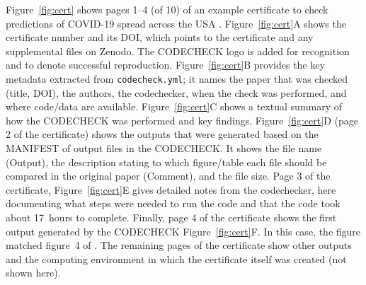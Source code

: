 \documentclass[12pt]{article}
\begin{document}
Figure~\ref{fig:cert} shows pages 1--4 (of 10) of an example
certificate to check predictions of COVID-19 spread across the USA
\cite{cert-2020-012,unwin_report_2020}.  Figure~\ref{fig:cert}A shows
the certificate number and its DOI, which points to the certificate
and any supplemental files on Zenodo.  The CODECHECK logo is added for
recognition and to denote successful reproduction.
Figure~\ref{fig:cert}B provides the key metadata extracted from
\texttt{codecheck.yml}; it names the paper that was checked (title,
DOI), the authors, the codechecker, when the check was performed, and
where code/data are available.
Figure~\ref{fig:cert}C shows a textual summary of how the CODECHECK
was performed and key findings.  Figure~\ref{fig:cert}D
(page 2 of the certificate) shows the outputs that were generated
based on the MANIFEST of output files in the CODECHECK.  It shows the
file name (Output), the description stating to which figure/table each
file should be compared in the original paper (Comment), and the file
size.  Page 3 of the certificate, Figure~\ref{fig:cert}E gives
detailed notes from the codechecker, here documenting what steps were
needed to run the code and that the code took about 17~hours to
complete. Finally, page 4 of the certificate shows the first output
generated by the CODECHECK Figure~\ref{fig:cert}F. In this case, the
figure matched figure~4 of \cite{unwin_report_2020}.  The remaining
pages of the certificate show other outputs and the computing
environment in which the certificate itself was created (not shown
here).
\end{document}
